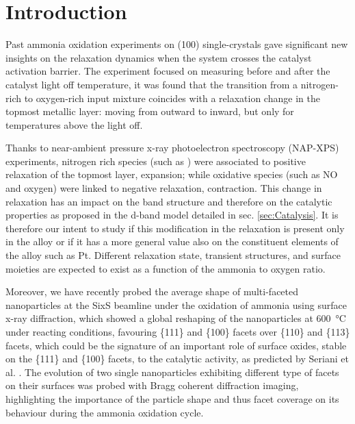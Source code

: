\section{Introduction}

Past ammonia oxidation experiments on  (100) \parencite{Resta2020a} single-crystals gave significant new insights on the relaxation dynamics when the system crosses the catalyst activation barrier.
The experiment focused on measuring before and after the catalyst light off temperature, it was found that the transition from a nitrogen-rich to oxygen-rich input mixture coincides with a relaxation change in the topmost metallic layer: moving from outward to inward, but only for temperatures above the light off.

Thanks to near-ambient pressure x-ray photoelectron spectroscopy (NAP-XPS) experiments, nitrogen rich species (such as \nitrogen) were associated to positive relaxation of the topmost layer, expansion; while oxidative species (such as NO and oxygen) were linked to negative relaxation, contraction.
This change in relaxation has an impact on the band structure and therefore on the catalytic properties as proposed in the d-band model detailed in sec. \ref{sec:Catalysis}.
It is therefore our intent to study if this modification in the relaxation is present only in the  alloy or if it has a more general value also on the constituent elements of the alloy such as Pt.
Different relaxation state, transient structures, and surface moieties are expected to exist as a function of the ammonia to oxygen ratio.

Moreover, we have recently probed the average shape of multi-faceted nanoparticles at the SixS beamline under the oxidation of ammonia using surface x-ray diffraction, which showed a global reshaping of the nanoparticles at \qty{600}{\degreeCelsius} under reacting conditions, favouring \{111\} and \{100\} facets over \{110\} and \{113\} facets, which could be the signature of an important role of surface oxides, stable on the \{111\} and \{100\} facets, to the catalytic activity, as predicted by Seriani et al. \parencite*{Seriani2008}.
The evolution of two single nanoparticles exhibiting different type of facets on their surfaces was probed with Bragg coherent diffraction imaging, highlighting the importance of the particle shape and thus facet coverage on its behaviour during the ammonia oxidation cycle.


